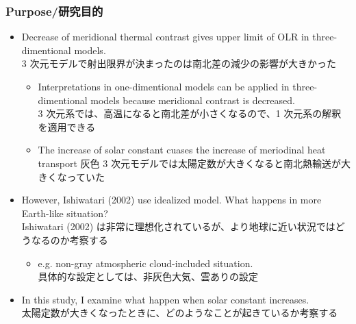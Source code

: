 \documentclass[aspectratio=149,9pt,fleqn,tbtags]{beamer}
\newcommand{\jp}[1]{{\footnotesize #1}}
\begin{document}
\begin{frame}
	\frametitle{Purpose/研究目的}
	\begin{itemize}
		\item Decrease of meridional thermal contrast gives upper limit of OLR in three-dimentional models.\\
			\jp{3 次元モデルで射出限界が決まったのは南北差の減少の影響が大きかった}
			\begin{itemize}
				\item Interpretations in one-dimentional models can be applied
					in three-dimentional models because meridional contrast is decreased.\\
					\jp{3 次元系では、高温になると南北差が小さくなるので、1 次元系の解釈を適用できる}
				\item The increase of solar constant cuases the increase of meriodinal heat transport
					\jp{灰色 3 次元モデルでは太陽定数が大きくなると南北熱輸送が大きくなっていた}
			\end{itemize}
		\item However, Ishiwatari \etal (2002) use idealized model.
			What happens in more Earth-like situation?\\
			\jp{Ishiwatari \etal (2002) は非常に理想化されているが、より地球に近い状況ではどうなるのか考察する}
		\begin{itemize}
			\item e.g. non-gray atmospheric cloud-included situation.\\
				\jp{具体的な設定としては、非灰色大気、雲ありの設定}
		\end{itemize}
	\item In this study, I examine what happen when solar constant increases.\\
		\jp{太陽定数が大きくなったときに、どのようなことが起きているか考察する}

\end{itemize}
\end{frame}
\end{document}

